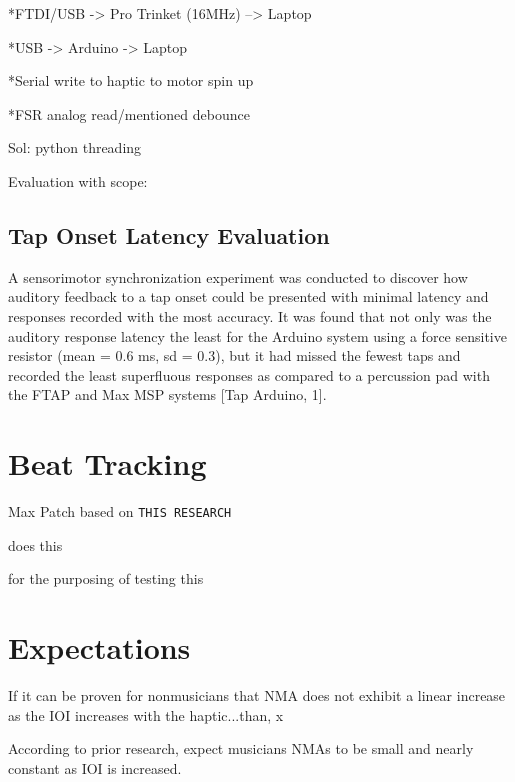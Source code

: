     *FTDI/USB -> Pro Trinket (16MHz) --> Laptop

    *USB -> Arduino -> Laptop

    *Serial write to haptic to motor spin up

    *FSR analog read/mentioned debounce

    Sol: python threading

    Evaluation with scope:



\subsection{Tap Onset Latency Evaluation}

A sensorimotor synchronization experiment was conducted to discover how auditory feedback to a tap onset could be presented with minimal latency and responses recorded with the most accuracy. It was found that not only was the auditory response latency the least for the Arduino system using a force sensitive resistor (mean = 0.6 ms, sd = 0.3), but it had missed the fewest taps and recorded the least superfluous responses as compared to a percussion pad with the FTAP and Max MSP systems [Tap Arduino, 1].


\section{Beat Tracking}

Max Patch based on \verb!THIS RESEARCH! 

does this

for the purposing of testing this

\section{Expectations}

If it can be proven for nonmusicians that NMA does not exhibit a linear increase as the IOI increases with the haptic...than, x

According to prior research, expect musicians NMAs to be small and nearly constant as IOI is increased.\cite{repp2013sensorimotor,4}



